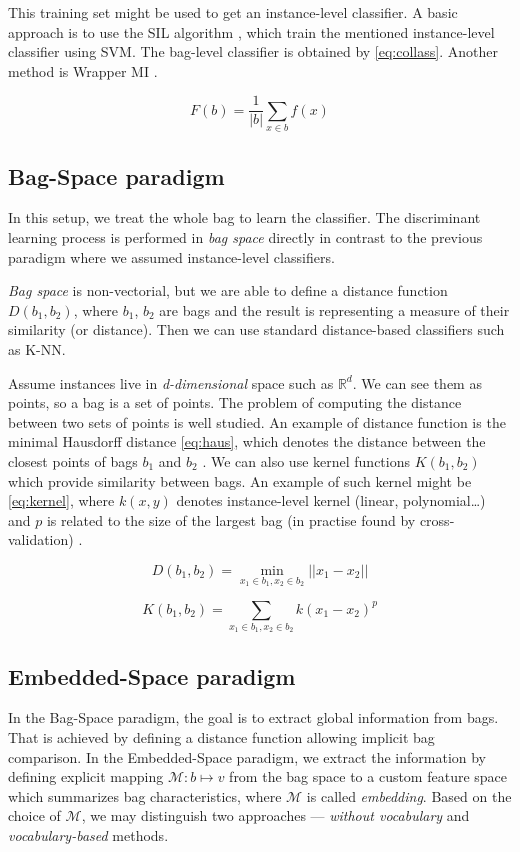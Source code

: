 This training set might be used to get an instance-level classifier. A basic approach is to use the SIL algorithm \cite{Bunescu2007}, which train the mentioned instance-level classifier using SVM. The bag-level classifier is obtained by \eqref{eq:collass}. Another method is Wrapper MI \cite{Frank2003}.

\begin{equation} \label{eq:collass}
    F(b)=\frac{1}{|b|}\sum_{x\in b}f(x)
\end{equation}

\subsection{Bag-Space paradigm}
In this setup, we treat the whole bag to learn the classifier. The discriminant learning process is performed in \emph{bag space} directly in contrast to the previous paradigm where we assumed instance-level classifiers.

\emph{Bag space} is non-vectorial, but we are able to define a distance function $D(b_1,b_2)$, where $b_1$, $b_2$ are bags and the result is representing a measure of their similarity (or distance). Then we can use standard distance-based classifiers such as K-NN.

Assume instances live in \emph{d-dimensional} space such as $\mathbb{R}^{d}$. We can see them as points, so a bag is a set of points. The problem of computing the distance between two sets of points is well studied. An example of distance function is the minimal Hausdorff distance \eqref{eq:haus}, which denotes the distance between the closest points of bags $b_1$ and $b_2$ \cite{Wang2000}. We can also use kernel functions $K(b_1,b_2)$ which provide similarity between bags. An example of such kernel might be \eqref{eq:kernel}, where $k(x,y)$  denotes instance-level kernel (linear, polynomial\dots) and $p$ is related to the size of the largest bag (in practise found by cross-validation) \cite{Gartner2002}.

\begin{equation} \label{eq:haus}
    D(b_1,b_2)=\min_{x_1\in b_1, x_2\in b_2}||x_1-x_2||
\end{equation}

\begin{equation} \label{eq:kernel}
    K(b_1,b_2)=\sum_{x_1\in b_1, x_2\in b_2}k(x_1-x_2)^{p}
\end{equation}

\subsection{Embedded-Space paradigm}
In the Bag-Space paradigm, the goal is to extract global information from bags. That is achieved by defining a distance function allowing implicit bag comparison. In the Embedded-Space paradigm, we extract the information by defining explicit mapping $\mathcal{M}:b\mapsto v$ from the bag space to a custom feature space which summarizes bag characteristics,  where $\mathcal{M}$ is called \emph{embedding}. Based on the choice of $\mathcal{M}$, we may distinguish two approaches --- \emph{without vocabulary} and \emph{vocabulary-based} methods.

